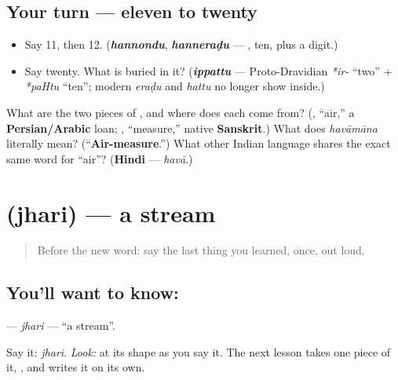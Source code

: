 \subsection*{Your turn — eleven to twenty}
\begin{itemize}
\raggedright
  \item Say 11, then 12. (\emph{\textbf{hannondu}}, \emph{\textbf{hanneraḍu}} — \textbf{}, ten, plus a digit.)
  \item Say twenty. What is buried in it? (\emph{\textbf{ippattu}} — Proto-Dravidian \emph{*ir-} \textquotedblleft{}two\textquotedblright{} + \emph{*paHtu} \textquotedblleft{}ten\textquotedblright{}; modern \emph{eraḍu} and \emph{hattu} no longer show inside.)
\end{itemize}

\begin{tcolorbox}[breakable,colback=teal!4,colframe=teal!35!black,title={Before you move on}]
What are the two pieces of \textbf{}, and where does each come from? (\textbf{}, \textquotedblleft{}air,\textquotedblright{} a \textbf{Persian/Arabic} loan; \textbf{}, \textquotedblleft{}measure,\textquotedblright{} native \textbf{Sanskrit}.) What does \emph{havāmāna} literally mean? (\textquotedblleft{}\textbf{Air-measure}.\textquotedblright{}) What other Indian language shares the exact same word for \textquotedblleft{}air\textquotedblright{}? (\textbf{Hindi} — \emph{havā}.)
\end{tcolorbox}
\section[\texorpdfstring{\kn{ಝರಿ} (jhari)}{ಝರಿ (jhari)}]{ (jhari) — a stream}

\label{lesson:KA-C20-jhari}



\begin{quote}
Before the new word: say the last thing you learned, once, out loud.
\end{quote}

\subsection*{You'll want to know: }
\textbf{} — \emph{jhari} — \textquotedblleft{}a stream\textquotedblright{}.

Say it: \emph{jhari}. \emph{Look:} at its shape as you say it. The next lesson takes one piece of it, \textbf{}, and writes it on its own.

